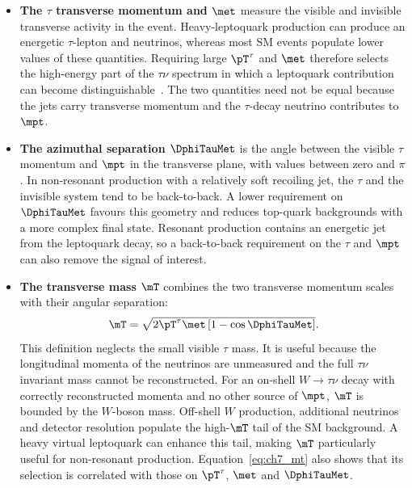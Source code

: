 \begin{itemize}
    \item \textbf{The $\tau$ transverse momentum and $\met$} measure the visible and invisible transverse activity in the event.
    Heavy-leptoquark production can produce an energetic $\tau$-lepton and neutrinos, whereas most SM events populate lower values of these quantities.
    Requiring large $\pT^\tau$ and $\met$ therefore selects the high-energy part of the $\tau\nu$ spectrum in which a leptoquark contribution can become distinguishable~\cite{Endo2022NonResonant}.
    The two quantities need not be equal because the jets carry transverse momentum and the $\tau$-decay neutrino contributes to $\mpt$.

    \item \textbf{The azimuthal separation $\DphiTauMet$} is the angle between the visible $\tau$ momentum and $\mpt$ in the transverse plane, with values between zero and $\pi$.
    In non-resonant production with a relatively soft recoiling jet, the $\tau$ and the invisible system tend to be back-to-back.
    A lower requirement on $\DphiTauMet$ favours this geometry and reduces top-quark backgrounds with a more complex final state.
    Resonant production contains an energetic jet from the leptoquark decay, so a back-to-back requirement on the $\tau$ and $\mpt$ can also remove the signal of interest.

    \item \textbf{The transverse mass $\mT$} combines the two transverse momentum scales with their angular separation:
    \begin{equation}
        \mT = \sqrt{2\pT^\tau\met\left[1-\cos\DphiTauMet\right]}.
        \label{eq:ch7_mt}
    \end{equation}
    This definition neglects the small visible $\tau$ mass.
    It is useful because the longitudinal momenta of the neutrinos are unmeasured and the full $\tau\nu$ invariant mass cannot be reconstructed.
    For an on-shell $W\to\tau\nu$ decay with correctly reconstructed momenta and no other source of $\mpt$, $\mT$ is bounded by the $W$-boson mass.
    Off-shell $W$ production, additional neutrinos and detector resolution populate the high-$\mT$ tail of the SM background.
    A heavy virtual leptoquark can enhance this tail, making $\mT$ particularly useful for non-resonant production.
    Equation~\ref{eq:ch7_mt} also shows that its selection is correlated with those on $\pT^\tau$, $\met$ and $\DphiTauMet$.


\end{itemize}
